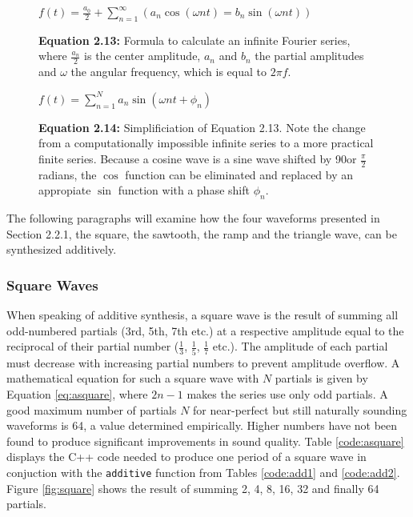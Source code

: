 \documentclass[12pt,twoside]{report}
\begin{document}
\begin{figure}[h!]
  $f(t) = \frac{a_{0}}{2} + \sum\limits_{n=1}^\infty (a_{n} \cos(\omega n t) = b_{n} \sin(\omega n t))$
  \caption*{\textbf{Equation 2.13: }Formula to calculate an infinite Fourier series, where $\frac{a_{n}}{2}$ is the center amplitude, $a_{n}$ and $b_{n}$ the partial amplitudes and $\omega$ the angular frequency, which is equal to $2 \pi f$.}
  \label{fig:fourier1}
\end{figure}

\begin{figure}[h!]
  $f(t) = \sum\limits_{n=1}^N a_{n} \sin(\omega n t + \phi_{n})$
  \caption*{\textbf{Equation 2.14:} Simplificiation of Equation 2.13. Note the change from a computationally impossible infinite series to a more practical finite series. Because a cosine wave is a sine wave shifted by 90\degree or $\frac{\pi}{2}$ radians, the $\cos$ function can be eliminated and replaced by an appropiate $\sin$ function with a phase shift $\phi_{n}$.}
  \label{fig:fourier2}
\end{figure}

\begin{table}
   {}
\end{table}

\noindent The following paragraphs will examine how the four waveforms presented in Section 2.2.1, the square, the sawtooth, the ramp and the triangle wave, can be synthesized additively.

\subsubsection{Square Waves}

When speaking of additive synthesis, a square wave is the result of summing all odd-numbered partials (3rd, 5th, 7th etc.) at a respective amplitude equal to the reciprocal of their partial number ($\frac{1}{3}$, $\frac{1}{5}$, $\frac{1}{7}$ etc.). The amplitude of each partial must decrease with increasing partial numbers to prevent amplitude overflow. A mathematical equation for such a square wave with $N$ partials is given by Equation \ref{eq:asquare}, where $2n - 1$ makes the series use only odd partials. A good maximum number of partials $N$ for near-perfect but still naturally sounding waveforms is 64, a value determined empirically. Higher numbers have not been found to produce significant improvements in sound quality. Table \ref{code:asquare} displays the C++ code needed to produce one period of a square wave in conjuction with the \texttt{additive} function from Tables \ref{code:add1} and \ref{code:add2}. Figure \ref{fig:square} shows the result of summing 2, 4, 8, 16, 32 and finally 64 partials.
\end{document}
